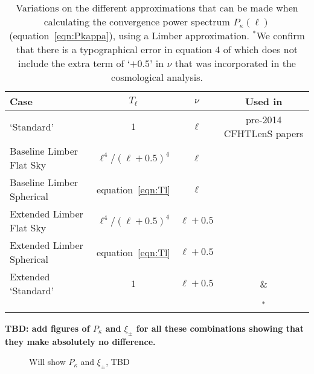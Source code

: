  \begin{table}[htb]
\label{tab:Tl_nu}
\begin{center}
\begin{tabular}{ | l | c | c  | c |}
\hline
Case & $T_\ell$ & $\nu$ & Used in \\ \hline
\citet{kitching/etal:2016} `Standard' & $1$ & $\ell$ & pre-2014 CFHTLenS papers \\
Baseline Limber Flat Sky &  $\ell^4 / (\ell + 0.5)^4$ & $\ell$ & \\
Baseline Limber Spherical & equation~\ref{eqn:Tl} & $\ell$ & \\
Extended Limber Flat Sky & $\ell^4 / (\ell + 0.5)^4$ & $\ell + 0.5$ & \\
Extended Limber Spherical & equation~\ref{eqn:Tl}& $\ell + 0.5$  & \\
Extended `Standard' & $1$ & $\ell + 0.5$ & \citet{joudaki/etal:2016} \&  \\
  & & & \citet{hildebrandt/etal:2016}$^*$\\\hline
 \end{tabular}
 \end{center}
 \caption{Variations on the different approximations that can be made when calculating the convergence power spectrum $P_\kappa(\ell)$ (equation~\ref{eqn:Pkappa}), using a Limber approximation.  $^*$We confirm that there is a typographical error in equation 4 of \citet{hildebrandt/etal:2016} which does not include the extra term of `$+0.5$' in $\nu$ that was incorporated in the cosmological analysis.}  
 \end{table}

{\bf TBD: add figures of $P_\kappa$ and $\xi_\pm$ for all these combinations showing that they make absolutely no difference.}
 
 \begin{figure}
 \label{fig:Cl_xi}
 \caption{Will show $P_\kappa$ and $\xi_\pm$, TBD}
 \end{figure}
 
